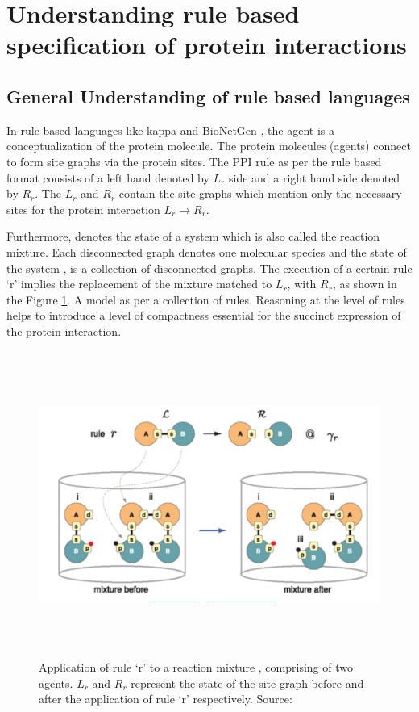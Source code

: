 \documentclass[msc,deptreport,ai]{infthesis}      %
\begin{document}
\section{Understanding rule based specification of protein interactions}
\subsection{General Understanding of rule based languages}
In rule based languages like kappa \cite{kappa} and BioNetGen \cite{bioNetGen}, the agent is a conceptualization of the protein molecule. The protein molecules (agents) connect to form site graphs via the protein sites. The PPI rule as per the rule based format consists of a left hand denoted by $L_r$  side and a right hand side denoted by $R_r$. The $L_r$ and $R_r$ contain the site graphs which mention only the necessary sites for the protein interaction $L_r \to R_r$. 

Furthermore,  denotes the state of a system which is also called the reaction mixture. Each disconnected graph denotes one molecular species and the state of the system ,  is a collection of disconnected graphs. The execution of a certain rule `r' implies the replacement of the mixture matched to $L_r$, with $R_r$, as shown in the Figure \ref{fig:mixture}. A model as per \cite{kappaPlatform} a collection of rules. Reasoning at the level of rules helps to introduce a level of compactness essential for the succinct expression of the protein interaction. 

\begin{figure}[H]
	\centering
	\captionsetup{justification=centering}
	\includegraphics[width=\linewidth,height=10cm,keepaspectratio]{mixture.png}	
	\caption{Application of rule `r' to a reaction mixture  , comprising of two agents. $L_r$ and $R_r$ represent the state of the site graph before and after the application of rule `r'  respectively. Source: \cite{kappaPlatform}}
	\label{fig:mixture}
\end{figure}
\end{document}
